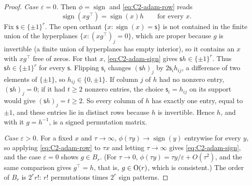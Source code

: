 \begin{proof}
\emph{Case $\varepsilon=0$.} Then $\phi=\operatorname{sign}$ and \eqref{eq:C2-adam-row} reads
\begin{equation}\label{eq:C2-adam-sign}
\operatorname{sign}(xg^\top)=\operatorname{sign}(x)h\qquad\text{for every }x.
\end{equation}
Fix $\mathsf s\in\{\pm1\}^r$. The open orthant $\{x:\operatorname{sign}(x)=\mathsf s\}$ is not contained in the finite union
of the hyperplanes $\{x:(xg^\top)_j=0\}$, which are proper because $g$ is invertible (a finite union of hyperplanes has
empty interior), so it contains an $x$ with $xg^\top$
free of zeros. For that $x$, \eqref{eq:C2-adam-sign} gives $\mathsf sh\in\{\pm1\}^r$. Thus $\mathsf sh\in\{\pm1\}^r$ for
every $\mathsf s$. Flipping $\mathsf s_i$ changes $(\mathsf sh)_j$ by $2\mathsf s_ih_{ij}$, a difference of two elements of
$\{\pm1\}$, so $h_{ij}\in\{0,\pm1\}$. If column $j$ of $h$ had no nonzero entry, $(\mathsf sh)_j=0$; if it had $t\ge2$
nonzero entries, the choice $\mathsf s_i=h_{ij}$ on its support would give $(\mathsf sh)_j=t\ge2$. So every column of $h$
has exactly one entry, equal to $\pm1$, and these entries lie in distinct rows because $h$ is invertible. Hence $h$, and
with it $g=h^{-1}$, is a signed permutation matrix.

\emph{Case $\varepsilon>0$.} For a fixed $x$ and $\tau\to\infty$, $\phi(\tau y)\to\operatorname{sign}(y)$ entrywise for every
$y$, so applying \eqref{eq:C2-adam-row} to $\tau x$ and letting $\tau\to\infty$ gives \eqref{eq:C2-adam-sign}, and the case
$\varepsilon=0$ shows $g\in B_r$. (For $\tau\to0$, $\phi(\tau y)=\tau y/\varepsilon+O(\tau^2)$, and the same comparison
gives $g^\top=h$, that is, $g\in\mathrm{O}(r)$, which is consistent.) The order of $B_r$ is $2^rr!$: $r!$ permutations times
$2^r$ sign patterns.


\end{proof}
